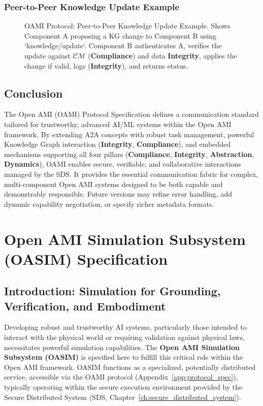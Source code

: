 \documentclass[12pt,a4paper]{report}
\newcommand{\Compliance}{\textbf{Compliance}}
\newcommand{\Integrity}{\textbf{Integrity}}
\newcommand{\Abstraction}{\textbf{Abstraction}}
\newcommand{\Dynamics}{\textbf{Dynamics}}
\begin{document}
	\subsection{Peer-to-Peer Knowledge Update Example}
	\label{app:oami_flow_peer_to_peer}
	
	\begin{figure}[H]
		\centering
		\caption{OAMI Protocol: Peer-to-Peer Knowledge Update Example. Shows Component A proposing a KG change to Component B using `knowledge/update`. Component B authenticates A, verifies the update against $\mathcal{CM}$ (\textbf{Compliance}) and data \Integrity, applies the change if valid, logs (\Integrity), and returns status.}
		\label{fig:oami_peer_to_peer_flow}
	\end{figure}
	
	\section{Conclusion}
	\label{app:oami_conclusion}
	
	The Open AMI (OAMI) Protocol Specification defines a communication standard tailored for trustworthy, advanced AI/ML systems within the Open AMI framework. By extending A2A concepts with robust task management, powerful Knowledge Graph interaction (\Integrity, \textbf{Compliance}), and embedded mechanisms supporting all four pillars (\Compliance, \Integrity, \Abstraction, \Dynamics), OAMI enables secure, verifiable, and collaborative interactions managed by the SDS. It provides the essential communication fabric for complex, multi-component Open AMI systems designed to be both capable and demonstrably responsible. Future versions may refine error handling, add dynamic capability negotiation, or specify richer metadata formats.
	
		\chapter{Open AMI Simulation Subsystem (OASIM) Specification}
	\label{app:simulation_subsystem}
	
	\section{Introduction: Simulation for Grounding, Verification, and Embodiment}
	\label{app:oasim_intro}
	
	Developing robust and trustworthy AI systems, particularly those intended to interact with the physical world or requiring validation against physical laws, necessitates powerful simulation capabilities. The \textbf{Open AMI Simulation Subsystem (OASIM)} is specified here to fulfill this critical role within the Open AMI framework. OASIM functions as a specialized, potentially distributed service, accessible via the OAMI protocol (Appendix~\ref{app:protocol_spec}), typically operating within the secure execution environment provided by the Secure Distributed System (SDS, Chapter~\ref{ch:secure_distributed_system}).
	
\end{document}

